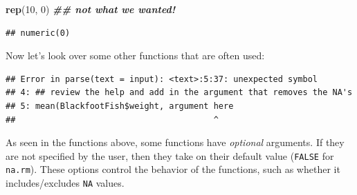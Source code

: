 \documentclass[
  10pt,
  letterpaper,
  twoside,
  openright]{book}
\newenvironment{Shaded}{\begin{snugshade}}{\end{snugshade}}
\newcommand{\DecValTok}[1]{\textcolor[rgb]{0.00,0.00,0.81}{#1}}
\newcommand{\DocumentationTok}[1]{\textcolor[rgb]{0.56,0.35,0.01}{\textbf{\textit{#1}}}}
\newcommand{\FunctionTok}[1]{\textcolor[rgb]{0.13,0.29,0.53}{\textbf{#1}}}
\newcommand{\NormalTok}[1]{#1}
\newcommand{\SpecialCharTok}[1]{\textcolor[rgb]{0.81,0.36,0.00}{\textbf{#1}}}
\begin{document}
\begin{Shaded}
\begin{Highlighting}[]
\FunctionTok{rep}\NormalTok{(}\DecValTok{10}\NormalTok{, }\DecValTok{0}\NormalTok{) }\DocumentationTok{\#\# not what we wanted!}
\end{Highlighting}
\end{Shaded}

\begin{verbatim}
## numeric(0)
\end{verbatim}

Now let's look over some other functions that are often used:

\begin{Shaded}
\end{Shaded}

\begin{verbatim}
## Error in parse(text = input): <text>:5:37: unexpected symbol
## 4: ## review the help and add in the argument that removes the NA's
## 5: mean(BlackfootFish$weight, argument here
##                                        ^
\end{verbatim}

As seen in the functions above, some functions have \emph{optional}
arguments. If they are not specified by the user, then they take on
their default value (\texttt{FALSE} for \texttt{na.rm}). These options
control the behavior of the functions, such as whether it
includes/excludes \texttt{NA} values.
\end{document}
